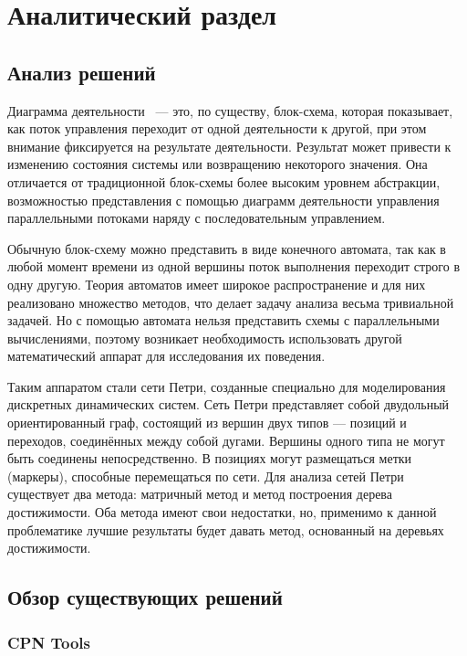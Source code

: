 ﻿\chapter{Аналитический раздел}
\label{cha:analysis}

\section{Анализ решений}

Диаграмма деятельности ~--- это, по существу, блок-схема, которая показывает, как поток управления переходит от одной деятельности к другой, при этом внимание фиксируется на результате деятельности. Результат может привести к изменению состояния системы или возвращению некоторого значения. Она отличается от традиционной блок-схемы более высоким уровнем абстракции, возможностью представления с помощью диаграмм деятельности управления параллельными потоками наряду с последовательным управлением.

Обычную блок-схему можно представить в виде конечного автомата, так как в любой момент времени из одной вершины поток выполнения переходит строго в одну другую. Теория автоматов имеет широкое распространение и для них реализовано множество методов, что делает задачу анализа весьма тривиальной задачей. Но с помощью автомата нельзя представить схемы с параллельными вычислениями, поэтому возникает необходимость использовать другой математический аппарат для исследования их поведения.

Таким аппаратом стали сети Петри, созданные специально для моделирования дискретных динамических систем. Сеть Петри представляет собой двудольный ориентированный граф, состоящий из вершин двух типов — позиций и переходов, соединённых между собой дугами. Вершины одного типа не могут быть соединены непосредственно. В позициях могут размещаться метки (маркеры), способные перемещаться по сети. Для анализа сетей Петри существует два метода: матричный метод и метод построения дерева достижимости. Оба метода имеют свои недостатки, но, применимо к данной проблематике лучшие результаты будет давать метод, основанный на деревьях достижимости.

\section{Обзор существующих решений}

\subsection{CPN Tools}


